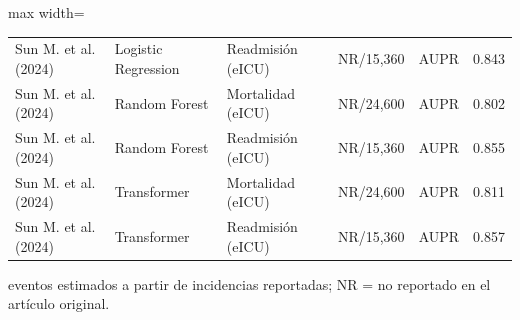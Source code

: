 \begin{table}[H]
\begin{adjustbox}{max width=\textwidth}
\begin{tabular}{llllll}
    Sun M. et al. (2024) & Logistic Regression & Readmisión (eICU) & NR/15,360 & AUPR & 0.843 \\
    Sun M. et al. (2024) & Random Forest & Mortalidad (eICU) & NR/24,600 & AUPR & 0.802 \\
    Sun M. et al. (2024) & Random Forest & Readmisión (eICU) & NR/15,360 & AUPR & 0.855 \\
    Sun M. et al. (2024) & Transformer & Mortalidad (eICU) & NR/24,600 & AUPR & 0.811 \\
    Sun M. et al. (2024) & Transformer & Readmisión (eICU) & NR/15,360 & AUPR & 0.857 \\
\bottomrule
\end{tabular}
\end{adjustbox}
\par\vspace{0.4em}\footnotesize * eventos estimados a partir de incidencias reportadas; NR = no reportado en el artículo original.
\end{table}